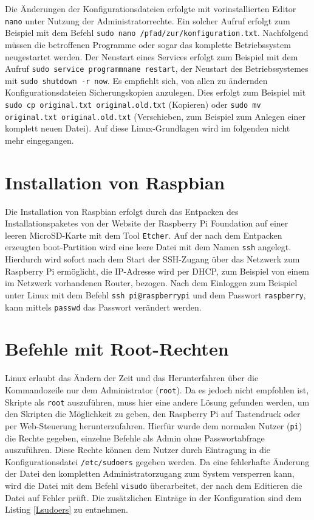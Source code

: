 \documentclass[a4paper,12pt,bibliography=totoc, listof=totoc,titlepage]{scrreprt}
\newcommand{\code}[1]{\texttt{#1}}
\begin{document}
Die Änderungen der Konfigurationsdateien erfolgte mit vorinstallierten Editor \code{nano} unter Nutzung der Administratorrechte. Ein solcher Aufruf erfolgt zum Beispiel mit dem Befehl \code{sudo nano /pfad/zur/konfiguration.txt}. Nachfolgend müssen die betroffenen Programme oder sogar das komplette Betriebssystem neugestartet werden. Der Neustart eines Services erfolgt zum Beispiel mit dem Aufruf \code{sudo service programmname restart}, der Neustart des Betriebssystemes mit \code{sudo shutdown -r now}. Es empfiehlt sich, von allen zu ändernden Konfigurationsdateien Sicherungskopien anzulegen. Dies erfolgt zum Beispiel mit \code{sudo cp original.txt original.old.txt} (Kopieren) oder \code{sudo mv original.txt original.old.txt} (Verschieben, zum Beispiel zum Anlegen einer komplett neuen Datei). Auf diese Linux-Grundlagen wird im folgenden nicht mehr eingegangen.

\section{Installation von Raspbian}
Die Installation von Raspbian erfolgt durch das Entpacken des Installationspaketes von der Website der Raspberry Pi Foundation auf einer leeren MicroSD-Karte mit dem Tool \code{Etcher}. Auf der nach dem Entpacken erzeugten boot-Partition wird eine leere Datei mit dem Namen \code{ssh} angelegt. Hierdurch wird sofort nach dem Start der SSH-Zugang über das Netzwerk zum Raspberry Pi ermöglicht, die IP-Adresse wird per DHCP, zum Beispiel von einem im Netzwerk vorhandenen Router, bezogen. Nach dem Einloggen zum Beispiel unter Linux mit dem Befehl \code{ssh pi@raspberrypi} und dem Passwort \code{raspberry}, kann mittels \code{passwd} das Passwort verändert werden.


\section{Befehle mit Root-Rechten}
\label{s:root}
Linux erlaubt das Ändern der Zeit und das Herunterfahren über die Kommandozeile nur dem Administrator (\code{root}). Da es jedoch nicht empfohlen ist, Skripte als \code{root} auszuführen, muss hier eine andere Lösung gefunden werden, um den Skripten die Möglichkeit zu geben, den Raspberry Pi auf Tastendruck oder per Web-Steuerung herunterzufahren. Hierfür wurde dem normalen Nutzer (\code{pi}) die Rechte gegeben, einzelne Befehle  als Admin ohne Passwortabfrage auszuführen. Diese Rechte können dem Nutzer durch Eintragung in die Konfigurationsdatei \code{/etc/sudoers} gegeben werden. Da eine fehlerhafte Änderung der Datei den kompletten Administratorzugang zum System versperren kann, wird die Datei mit dem Befehl \code{visudo} überarbeitet, der nach dem Editieren die Datei auf Fehler prüft. Die zusätzlichen Einträge in der Konfiguration sind dem Listing \ref{Lsudoers} zu entnehmen.\citep{sudoers}
\end{document}
